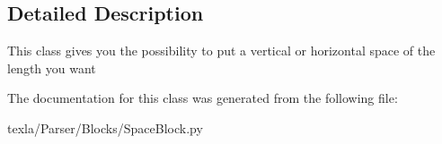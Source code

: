\subsection{Detailed Description}
\begin{DoxyVerb}This class gives you the possibility to
    put a vertical or horizontal space of the
    length you want\end{DoxyVerb}
 

The documentation for this class was generated from the following file\+:\begin{DoxyCompactItemize}
\item 
texla/\+Parser/\+Blocks/Space\+Block.\+py\end{DoxyCompactItemize}
